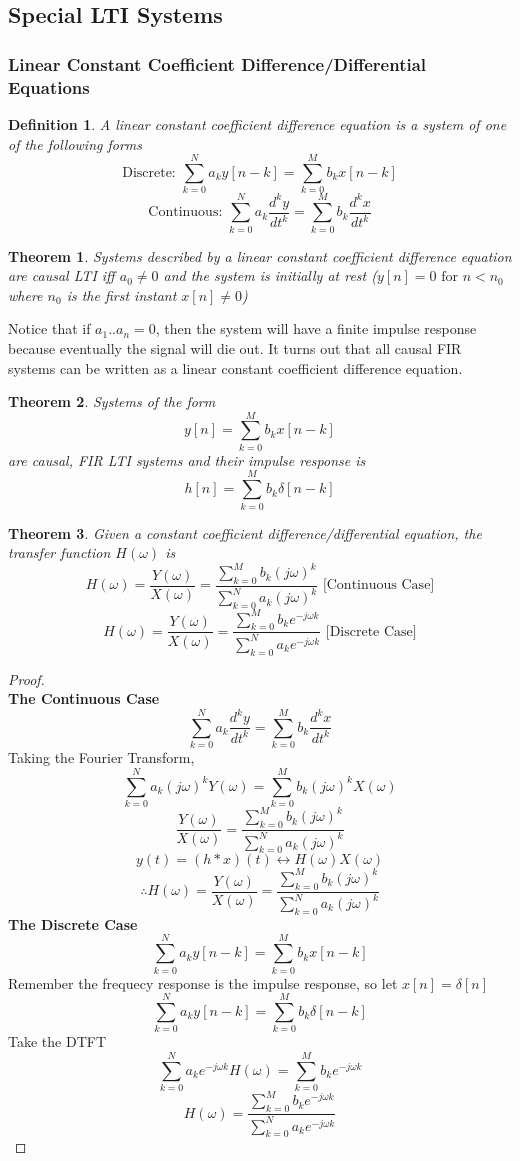 \documentclass{article}
\newtheorem{theorem}{Theorem}
\newtheorem{definition}{Definition}
\newtheorem{proof}{Proof}
\begin{document}
\subsection{Special LTI Systems}
\subsubsection{Linear Constant Coefficient Difference/Differential Equations}
\begin{definition}
    A linear constant coefficient difference equation is a system of one of the following forms
    $$\text{Discrete: } \sum_{k=0}^{N}{a_k y[n-k]} = \sum_{k=0}^{M}{b_k x[n-k]}$$
    $$\text{Continuous: } \sum_{k=0}^{N}{a_k\frac{d^ky}{dt^k}} = \sum_{k=0}^{M}{b_k\frac{d^kx}{dt^k}}$$
\end{definition}
\begin{theorem}
    Systems described by a linear constant coefficient difference equation are causal LTI iff $a_0 \ne 0$
    and the system is initially at rest ($y[n] = 0 \text{ for } n < n_0$ where $n_0$ is the first instant $x[n] \ne 0$)
\end{theorem}
Notice that if $a_1..a_n = 0$, then the system will have a finite impulse response because eventually the signal will die out.
It turns out that all causal FIR systems can be written as a linear constant coefficient difference equation.
\begin{theorem}
    Systems of the form
    $$y[n] = \sum_{k=0}^{M}{b_k x[n-k]}$$ are causal, FIR LTI systems and their impulse response is
    $$h[n] = \sum_{k=0}^{M}{b_k \delta[n-k]}$$
\end{theorem}
\begin{theorem}
    Given a constant coefficient difference/differential equation, the transfer function $H(\omega)$ is
    $$H(\omega) = \frac{Y(\omega)}{X(\omega)} = \frac{\sum_{k=0}^{M}{b_k(j\omega)^k}}{\sum_{k=0}^{N}{a_k(j\omega)^k}}\text{ [Continuous Case]}$$
    $$H(\omega) = \frac{Y(\omega)}{X(\omega)} = \frac{\sum_{k=0}^{M}{b_ke^{-j\omega k}}}{\sum_{k=0}^{N}{a_ke^{-j\omega k}}}\text{ [Discrete Case]}$$
\end{theorem}
\begin{proof}
    \textbf{\\The Continuous Case}
    $$\sum_{k=0}^{N}{a_k\frac{d^ky}{dt^k}} = \sum_{k=0}^{M}{b_k\frac{d^kx}{dt^k}}$$
    Taking the Fourier Transform,
    $$\sum_{k=0}^{N}{a_k(j\omega)^k Y(\omega)} = \sum_{k=0}^{M}{b_k(j\omega)^k X(\omega)}$$
    $$\frac{Y(\omega)}{X(\omega)} = \frac{\sum_{k=0}^{M}{b_k(j\omega)^k}}{\sum_{k=0}^{N}{a_k(j\omega)^k}}$$
    $$y(t) = (h*x)(t) \leftrightarrow H(\omega)X(\omega)$$
    $$\therefore H(\omega) = \frac{Y(\omega)}{X(\omega)} = \frac{\sum_{k=0}^{M}{b_k(j\omega)^k}}{\sum_{k=0}^{N}{a_k(j\omega)^k}}$$
    \textbf{The Discrete Case}
    $$\sum_{k=0}^{N}{a_k y[n-k]} = \sum_{k=0}^{M}{b_k x[n-k]}$$
    Remember the frequecy response is the impulse response, so let $x[n] = \delta[n]$
    $$\sum_{k=0}^{N}{a_k y[n-k]} = \sum_{k=0}^{M}{b_k \delta[n-k]}$$
    Take the DTFT
    $$\sum_{k=0}^{N}{a_k e^{-j\omega k}H(\omega)} = \sum_{k=0}^{M}{b_k e^{-j\omega k}}$$
    $$H(\omega) = \frac{\sum_{k=0}^{M}{b_k e^{-j\omega k}}}{\sum_{k=0}^{N}{a_k e^{-j\omega k}}}$$
\end{proof}
\end{document}
